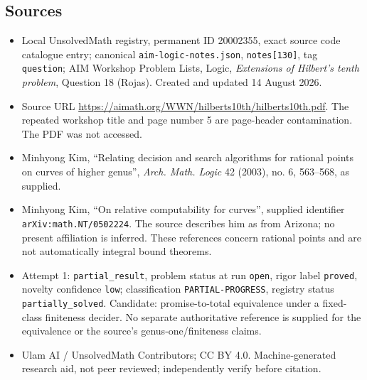 \documentclass[11pt]{article}
\begin{document}
\subsection{Sources}
\begin{itemize}
\item Local UnsolvedMath registry, permanent ID 20002355, exact source code catalogue entry; canonical \texttt{aim-logic-notes.json}, \texttt{notes[130]}, tag \texttt{question}; AIM Workshop Problem Lists, Logic, \emph{Extensions of Hilbert's tenth problem}, Question 18 (Rojas). Created and updated 14 August 2026.
\item Source URL \url{https://aimath.org/WWN/hilberts10th/hilberts10th.pdf}. The repeated workshop title and page number 5 are page-header contamination. The PDF was not accessed.
\item Minhyong Kim, ``Relating decision and search algorithms for rational points on curves of higher genus'', \emph{Arch. Math. Logic} 42 (2003), no. 6, 563--568, as supplied.
\item Minhyong Kim, ``On relative computability for curves'', supplied identifier \texttt{arXiv:math.NT/0502224}. The source describes him as from Arizona; no present affiliation is inferred. These references concern rational points and are not automatically integral bound theorems.
\item Attempt 1: \texttt{partial\_result}, problem status at run \texttt{open}, rigor label \texttt{proved}, novelty confidence \texttt{low}; classification \texttt{PARTIAL-PROGRESS}, registry status \texttt{partially\_solved}. Candidate: promise-to-total equivalence under a fixed-class finiteness decider. No separate authoritative reference is supplied for the equivalence or the source's genus-one/finiteness claims.
\item Ulam AI / UnsolvedMath Contributors; CC BY 4.0. Machine-generated research aid, not peer reviewed; independently verify before citation.
\end{itemize}
\end{document}

